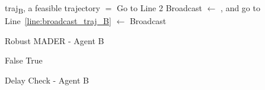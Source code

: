 \begin{algorithm}[h]
    \begin{algorithmic}[1]
    \Require traj\textsubscript{B}, a feasible trajectory
        \State \trajBNew{} $=$ \textproc{\OptimizationStep{}()} \label{line:traj_opt}
            \State Go to Line 2
        \EndIf
        \State Broadcast \trajBNew{} \label{line:broadcast_traj_B_new}
            \State \trajB{} $\leftarrow$ \trajBPrev{}, and go to Line~\ref{line:broadcast_traj_B}\label{line:DC_not_satisfied}
        \EndIf
        \State \trajB{} $\leftarrow$ \trajBNew{} \label{line:DC_satisfied}
        \State Broadcast \trajB{} \label{line:broadcast_traj_B}
    \EndWhile
    \end{algorithmic}
    \caption{Robust MADER - Agent B}
    \label{alg:rmader}
\end{algorithm}

\begin{algorithm}[h]
    \newcommand{\algorithmicbreak}{\textbf{break}}
    \begin{algorithmic}[1] %
    \Function {\textproc{\DelayCheckStep{}}}{\trajBNew{}}
                \State \Return False
             \EndIf
         \EndFor
    \State \Return True
    \EndFunction
    \end{algorithmic}
    \caption{Delay Check - Agent B}\label{alg:pess_delaycheck}
\end{algorithm}

